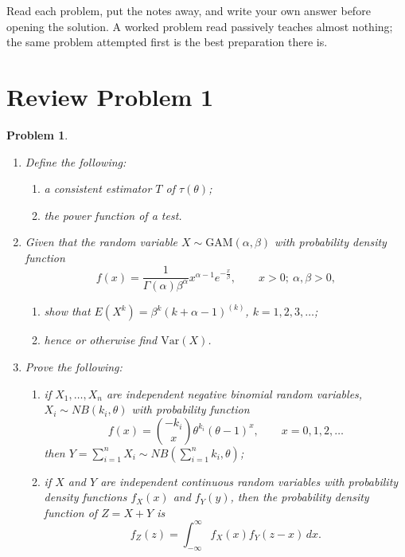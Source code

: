 \documentclass[12pt,a4paper]{report}
\theoremstyle{definition}
\theoremstyle{plain}
\newtheorem{problemx}{Problem}[section]
\newenvironment{problem}{\begin{problemx}}{\end{problemx}}
\begin{document}
Read each problem, put the notes away, and write your own answer before opening
the solution. A worked problem read passively teaches almost nothing; the same
problem attempted first is the best preparation there is.

\section{Review Problem 1}

\begin{problem}
\begin{enumerate}
\item[(a).] Define the following:
  \begin{enumerate}
  \item[(i).] a consistent estimator $T$ of $\tau(\theta)$;
  \item[(ii).] the power function of a test.
  \end{enumerate}
\item[(b).] Given that the random variable $X\sim\text{GAM}(\alpha,\beta)$ with
probability density function
\[f(x)=\frac{1}{\Gamma(\alpha)\beta^\alpha}x^{\alpha-1}e^{-\frac{x}{\beta}},
\qquad x>0;\ \alpha,\beta>0,\]
  \begin{enumerate}
  \item[(i).] show that $E\left(X^k\right)=\beta^k(k+\alpha-1)^{(k)}$,
  $k=1,2,3,\ldots$;
  \item[(ii).] hence or otherwise find $\text{Var}(X)$.
  \end{enumerate}
\item[(c).] Prove the following:
  \begin{enumerate}
  \item[(i).] if $X_1,\ldots,X_n$ are independent negative binomial random
  variables, $X_i\sim NB(k_i,\theta)$ with probability function
  \[f(x)=\binom{-k_i}{x}\theta^{k_i}(\theta-1)^x,\qquad x=0,1,2,\ldots\]
  then $Y=\sum_{i=1}^nX_i\sim NB\left(\sum_{i=1}^nk_i,\theta\right)$;
  \item[(ii).] if $X$ and $Y$ are independent continuous random variables with
  probability density functions $f_X(x)$ and $f_Y(y)$, then the probability
  density function of $Z=X+Y$ is
  \[f_Z(z)=\int_{-\infty}^{\infty}f_X(x)f_Y(z-x)\,dx.\]
  \end{enumerate}
\end{enumerate}
\end{problem}
\end{document}
